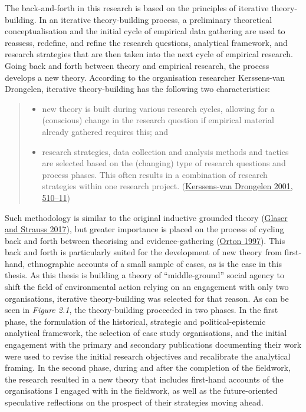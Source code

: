 \documentclass[a4paper, nobind]{templates/ociamthesis}
\begin{document}
The back-and-forth in this research is based on the principles of iterative theory-building. In an iterative theory-building process, a preliminary theoretical conceptualisation and the initial cycle of empirical data gathering are used to reassess, redefine, and refine the research questions, analytical framework, and research strategies that are then taken into the next cycle of empirical research. Going back and forth between theory and empirical research, the process develops a new theory. According to the organisation researcher Kerssens-van Drongelen, iterative theory-building has the following two characteristics:

\begin{quote}
\begin{itemize}
\item
  new theory is built during various research cycles, allowing for a (conscious) change in the research question if empirical material already gathered requires this; and
\item
  research strategies, data collection and analysis methods and tactics are selected based on the (changing) type of research questions and process phases. This often results in a combination of research strategies within one research project. (\protect\hyperlink{ref-kerssens-van_drongelen_iterative_2001}{Kerssens-van Drongelen 2001, 510--11})
\end{itemize}
\end{quote}

Such methodology is similar to the original inductive grounded theory (\protect\hyperlink{ref-glaser_discovery_2017}{Glaser and Strauss 2017}), but greater importance is placed on the process of cycling back and forth between theorising and evidence-gathering (\protect\hyperlink{ref-orton_inductive_1997}{Orton 1997}). This back and forth is particularly suited for the development of new theory from first-hand, ethnographic accounts of a small sample of cases, as is the case in this thesis. As this thesis is building a theory of ``middle-ground'' social agency to shift the field of environmental action relying on an engagement with only two organisations, iterative theory-building was selected for that reason. As can be seen in \emph{Figure 2.1}, the theory-building proceeded in two phases. In the first phase, the formulation of the historical, strategic and political-epistemic analytical framework, the selection of case study organisations, and the initial engagement with the primary and secondary publications documenting their work were used to revise the initial research objectives and recalibrate the analytical framing. In the second phase, during and after the completion of the fieldwork, the research resulted in a new theory that includes first-hand accounts of the organisations I engaged with in the fieldwork, as well as the future-oriented speculative reflections on the prospect of their strategies moving ahead.
\end{document}
